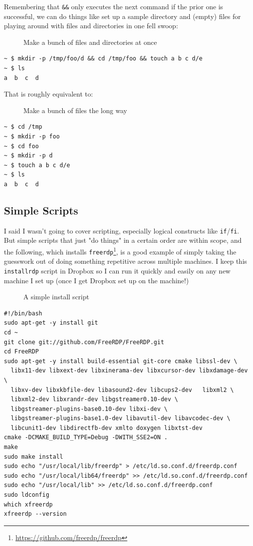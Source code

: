 \documentclass[10pt,]{book}
\renewcommand{\href}[2]{#2\footnote{\url{#1}}}
\numberwithin{figure}{chapter}
\DeclareRobustCommand{\drcap}[1]{\begin{figure}[H]\caption{#1}\end{figure}}
\DeclareRobustCommand{\drcmd}[1]{\index{Commands!#1}}
\begin{document}
Remembering that \texttt{\&\&} only executes the
next command if the prior one is successful, we can do things like set
up a sample directory and (empty) files for playing around with files
and directories in one fell swoop:

\drcap{Make a bunch of files and directories at once}

\begin{verbatim}
~ $ mkdir -p /tmp/foo/d && cd /tmp/foo && touch a b c d/e
~ $ ls
a  b  c  d
\end{verbatim}

That is roughly equivalent to:

\drcap{Make a bunch of files the long way}

\begin{verbatim}
~ $ cd /tmp
~ $ mkdir -p foo
~ $ cd foo
~ $ mkdir -p d
~ $ touch a b c d/e
~ $ ls
a  b  c  d
\end{verbatim}

\subsection*{Simple Scripts}\label{simple-scripts}

I said I wasn't going to cover scripting, especially logical constructs
like \texttt{if}/\texttt{fi}\drcmd{if}. But simple scripts that just "do
things" in a certain order are within scope, and the following, which
installs
\href{https://github.com/freerdp/freerdp}{\texttt{freerdp}}\drcmd{freerdp},
is a good example of simply taking the guesswork out of doing something
repetitive across multiple machines. I keep this \texttt{installrdp}
script in Dropbox so I can run it quickly and easily on any new machine
I set up (once I get Dropbox set up on the machine!)

\drcap{A simple install script}

\begin{verbatim}
#!/bin/bash
sudo apt-get -y install git
cd ~
git clone git://github.com/FreeRDP/FreeRDP.git
cd FreeRDP
sudo apt-get -y install build-essential git-core cmake libssl-dev \
  libx11-dev libxext-dev libxinerama-dev libxcursor-dev libxdamage-dev \
  libxv-dev libxkbfile-dev libasound2-dev libcups2-dev   libxml2 \
  libxml2-dev libxrandr-dev libgstreamer0.10-dev \
  libgstreamer-plugins-base0.10-dev libxi-dev \
  libgstreamer-plugins-base1.0-dev libavutil-dev libavcodec-dev \
  libcunit1-dev libdirectfb-dev xmlto doxygen libxtst-dev
cmake -DCMAKE_BUILD_TYPE=Debug -DWITH_SSE2=ON .
make
sudo make install
sudo echo "/usr/local/lib/freerdp" > /etc/ld.so.conf.d/freerdp.conf
sudo echo "/usr/local/lib64/freerdp" >> /etc/ld.so.conf.d/freerdp.conf
sudo echo "/usr/local/lib" >> /etc/ld.so.conf.d/freerdp.conf
sudo ldconfig
which xfreerdp
xfreerdp --version
\end{verbatim}
\end{document}
